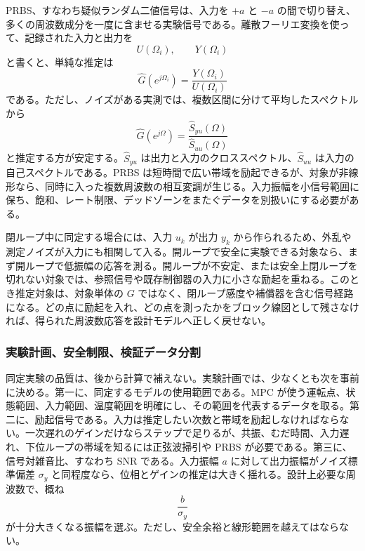 PRBS、すなわち疑似ランダム二値信号は、入力を $+a$ と $-a$ の間で切り替え、多くの周波数成分を一度に含ませる実験信号である。離散フーリエ変換を使って、記録された入力と出力を
\begin{equation}
  U(\Omega_i),\qquad Y(\Omega_i)
\end{equation}
と書くと、単純な推定は
\begin{equation}
  \hat{G}(e^{j\Omega_i})
  =\frac{Y(\Omega_i)}{U(\Omega_i)}
\end{equation}
である。ただし、ノイズがある実測では、複数区間に分けて平均したスペクトルから
\begin{equation}
  \hat{G}(e^{j\Omega})
  =
  \frac{\widehat{S}_{yu}(\Omega)}
       {\widehat{S}_{uu}(\Omega)}
\end{equation}
と推定する方が安定する。$\widehat{S}_{yu}$ は出力と入力のクロススペクトル、$\widehat{S}_{uu}$ は入力の自己スペクトルである。PRBS は短時間で広い帯域を励起できるが、対象が非線形なら、同時に入った複数周波数の相互変調が生じる。入力振幅を小信号範囲に保ち、飽和、レート制限、デッドゾーンをまたぐデータを別扱いにする必要がある。

閉ループ中に同定する場合には、入力 $u_k$ が出力 $y_k$ から作られるため、外乱や測定ノイズが入力にも相関して入る。開ループで安全に実験できる対象なら、まず開ループで低振幅の応答を測る。開ループが不安定、または安全上閉ループを切れない対象では、参照信号や既存制御器の入力に小さな励起を重ねる。このとき推定対象は、対象単体の $G$ ではなく、閉ループ感度や補償器を含む信号経路になる。どの点に励起を入れ、どの点を測ったかをブロック線図として残さなければ、得られた周波数応答を設計モデルへ正しく戻せない。

\subsubsection{実験計画、安全制限、検証データ分割}

同定実験の品質は、後から計算で補えない。実験計画では、少なくとも次を事前に決める。第一に、同定するモデルの使用範囲である。MPC が使う運転点、状態範囲、入力範囲、温度範囲を明確にし、その範囲を代表するデータを取る。第二に、励起信号である。入力は推定したい次数と帯域を励起しなければならない。一次遅れのゲインだけならステップで足りるが、共振、むだ時間、入力遅れ、下位ループの帯域を知るには正弦波掃引や PRBS が必要である。第三に、信号対雑音比、すなわち SNR である。入力振幅 $a$ に対して出力振幅がノイズ標準偏差 $\sigma_y$ と同程度なら、位相とゲインの推定は大きく揺れる。設計上必要な周波数で、概ね
\begin{equation}
  \frac{b}{\sigma_y}
\end{equation}
が十分大きくなる振幅を選ぶ。ただし、安全余裕と線形範囲を越えてはならない。

